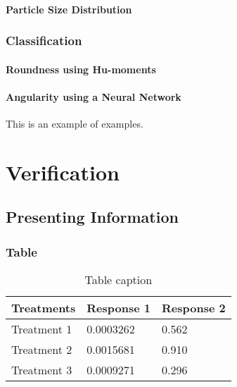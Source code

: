 \documentclass[11pt,fleqn,,a4paper,twoside,openright]{book}
\begin{document}
\subsection{Particle Size Distribution}


\section{Classification}

\subsection{Roundness using Hu-moments} \label{HuMoments}

\subsection{Angularity using a Neural Network} \label{NeuralNet}


This is an example of examples.

\part{Verification}


\chapter{Presenting Information}

\section{Table}

\begin{table}[h]
\centering
\begin{tabular}{l l l}
\toprule
\textbf{Treatments} & \textbf{Response 1} & \textbf{Response 2}\\
\midrule
Treatment 1 & 0.0003262 & 0.562 \\
Treatment 2 & 0.0015681 & 0.910 \\
Treatment 3 & 0.0009271 & 0.296 \\
\bottomrule
\end{tabular}
\caption{Table caption}
\end{table}
\end{document}
